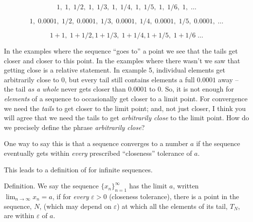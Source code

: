 $$
1, \; 1, \; 1/2, \; 1, \; 1/3, \; 1, \; 1/4, \; 1, \; 1/5, 
\; 1, \; 1/6, \; 1, \; \ldots
$$

$$
1, \; 0.0001, \; 1/2, \; 0.0001, \; 1/3, \; 0.0001, \; 1/4, 
\; 0.0001, \; 1/5, \; 0.0001, \; \ldots
$$

$$
1 + 1, \; 1+ 1/2, 1 + 1/3, \; 1 + 1/4, 1 + 1/5, \; 1 + 1/6 \; \ldots
$$

In the examples where the sequence ``goes to''
a point we see that the tails 
get closer and closer to this point.
In the examples where there wasn't 
we saw that getting close is a relative statement. In example 5,
individual elements get arbitrarily close to $0$, but every tail still
contains elements a full $0.0001$ away -- the tail {\it as a whole\/}
never gets closer than $0.0001$ to $0$. So, it is not enough for {\it elements\/} of a sequence to
occasionally get closer to a limit point.
For convergence we need the {\it tails\/} to get closer to the limit point; and, not just closer, I think you will 
agree that we need the tails to
get {\it arbitrarily close\/} to the limit point. 
How do we precisely define the phrase {\it arbitrarily close\/}?

One way to say this is that a sequence converges to a number $a$ if 
the sequence eventually gets within {\it every\/} 
prescribed ``closeness'' tolerance of $a$.

This leads to a definition of  for infinite sequences.

\proclaim Definition. We say the sequence 
$\{x_n\}_{n=1}^{\infty}$ has the limit $a$, written
$\lim_{n \rightarrow \infty} x_n = a$, if for {\it every}
$\varepsilon > 0$ (closeness tolerance), there is a point
in the sequence, $N$, (which may depend on $\varepsilon$) at which all the
elements of its tail, $T_N$, are within $\varepsilon$ of $a$.

